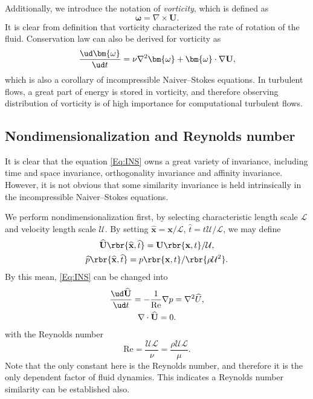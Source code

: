 \documentclass[english, nochinese]{pkupaper}
\begin{document}
Additionally, we introduce the notation of \emph{vorticity}, which is defined as
\begin{equation}
\bm{\omega} = \nabla \times \mathbf{U}.
\end{equation}
It is clear from definition that vorticity characterized the rate of rotation of the fluid. Conservation law can also be derived for vorticity as
\begin{equation}
\frac{ \ud \bm{\omega} }{ \ud t } = \nu \nabla^2 \bm{\omega} + \bm{\omega} \cdot \nabla \mathbf{U},
\end{equation}
which is also a corollary of incompressible Naiver--Stokes equations. In turbulent flows, a great part of energy is stored in vorticity, and therefore observing distribution of vorticity is of high importance for computational turbulent flows.

\subsection{Nondimensionalization and Reynolds number}

It is clear that the equation \eqref{Eq:INS} owns a great variety of invariance, including time and space invariance, orthogonality invariance and affinity invariance. However, it is not obvious that some similarity invariance is held intrinsically in the incompressible Naiver--Stokes equations.

We perform nondimensionalization first, by selecting characteristic length scale $\mathcal{L}$ and velocity length scale $\mathcal{U}$. By setting $ \widehat{\mathbf{x}} = \mathbf{x} / \mathcal{L} $, $ \widehat{t} = t \mathcal{U} / \mathcal{L} $, we may define
\begin{gather}
\widehat{\mathbf{U}} \rbr{ \widehat{\mathbf{x}}, \widehat{t} } = \mathbf{U} \rbr{ \mathbf{x}, t } / \mathcal{U}, \\
\widehat{p} \rbr{ \widehat{\mathbf{x}}, \widehat{t} } = p \rbr{ \mathbf{x}, t } / \rbr{ \rho \mathcal{U}^2 }.
\end{gather}
By this mean, \eqref{Eq:INS} can be changed into
\begin{equation} \label{Eq:NDINS}
\begin{gathered}
\frac{ \ud \widehat{\mathbf{U}} }{ \ud t } = -\frac{1}{\mathrm{Re}} \nabla p = \nabla^2 \widehat{U}, \\
\nabla \cdot \widehat{\mathbf{U}} = 0.
\end{gathered}
\end{equation}
with the Reynolds number
\begin{equation}
\mathrm{Re} = \frac{ \mathcal{U} \mathcal{L} }{\nu} = \frac{ \rho \mathcal{U} \mathcal{L} }{\mu}.
\end{equation}
Note that the only constant here is the Reynolds number, and therefore it is the only dependent factor of fluid dynamics. This indicates a Reynolds number similarity can be established also.
\end{document}
